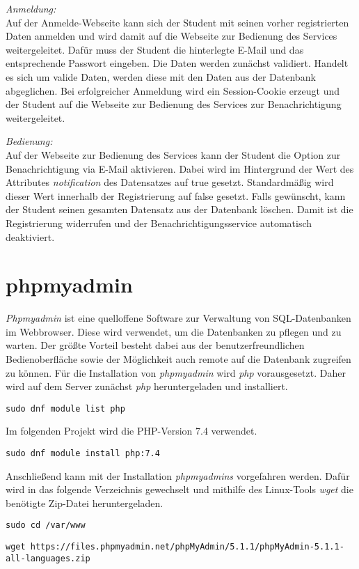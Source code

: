 \newpage

\textit{Anmeldung:}\\
Auf der Anmelde-Webseite kann sich der Student mit seinen vorher registrierten Daten anmelden und wird damit auf die Webseite zur Bedienung des Services weitergeleitet.
Dafür muss der Student die hinterlegte E-Mail und das entsprechende Passwort eingeben.
Die Daten werden zunächst validiert.
Handelt es sich um valide Daten, werden diese mit den Daten aus der Datenbank abgeglichen.
Bei erfolgreicher Anmeldung wird ein Session-Cookie erzeugt und der Student auf die Webseite zur Bedienung des Services zur Benachrichtigung weitergeleitet.

\textit{Bedienung:}\\
Auf der Webseite zur Bedienung des Services kann der Student die Option zur Benachrichtigung via E-Mail aktivieren.
Dabei wird im Hintergrund der Wert des Attributes \textit{notification} des Datensatzes auf true gesetzt.
Standardmäßig wird dieser Wert innerhalb der Registrierung auf false gesetzt.
Falls gewünscht, kann der Student seinen gesamten Datensatz aus der Datenbank löschen.
Damit ist die Registrierung widerrufen und der Benachrichtigungsservice automatisch deaktiviert.

\section{phpmyadmin}
\textit{Phpmyadmin} ist eine quelloffene Software zur Verwaltung von SQL-Datenbanken im Webbrowser.
Diese wird verwendet, um die Datenbanken zu pflegen und zu warten.
Der größte Vorteil besteht dabei aus der benutzerfreundlichen Bedienoberfläche sowie der Möglichkeit auch remote auf die Datenbank zugreifen zu können.
Für die Installation von \textit{phpmyadmin} wird \textit{php} vorausgesetzt.
Daher wird auf dem Server zunächst \textit{php} heruntergeladen und installiert.

\texttt{sudo dnf module list php}

Im folgenden Projekt wird die PHP-Version 7.4 verwendet.

\texttt{sudo dnf module install php:7.4}

Anschließend kann mit der Installation \textit{phpmyadmins} vorgefahren werden.
Dafür wird in das folgende Verzeichnis gewechselt und mithilfe des Linux-Tools \textit{wget} die benötigte Zip-Datei heruntergeladen.

\texttt{sudo cd /var/www}

\texttt{wget https://files.phpmyadmin.net/phpMyAdmin/5.1.1/phpMyAdmin-5.1.1-all-languages.zip}

